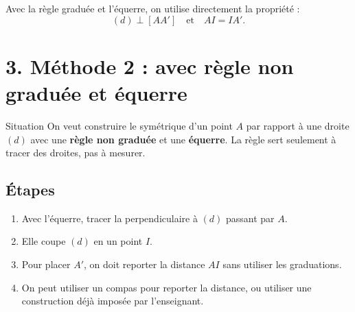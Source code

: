 \documentclass[11pt,a4paper]{article}
\begin{document}
\begin{center}
\end{center}

\begin{retenir}
Avec la règle graduée et l'équerre, on utilise directement la propriété :
\[
(d) \perp [AA']
\quad \text{et} \quad
AI=IA'.
\]
\end{retenir}

\section*{3. Méthode 2 : avec règle non graduée et équerre}

\begin{boite}{Situation}
On veut construire le symétrique d'un point $A$ par rapport à une droite $(d)$ avec une \textbf{règle non graduée} et une \textbf{équerre}.  
La règle sert seulement à tracer des droites, pas à mesurer.
\end{boite}

\subsection*{Étapes}

\begin{enumerate}[label=\textbf{Étape \arabic* :}]
    \item Avec l'équerre, tracer la perpendiculaire à $(d)$ passant par $A$.
    \item Elle coupe $(d)$ en un point $I$.
    \item Pour placer $A'$, on doit reporter la distance $AI$ sans utiliser les graduations.
    \item On peut utiliser un compas pour reporter la distance, ou utiliser une construction déjà imposée par l'enseignant.
\end{enumerate}
\end{document}

